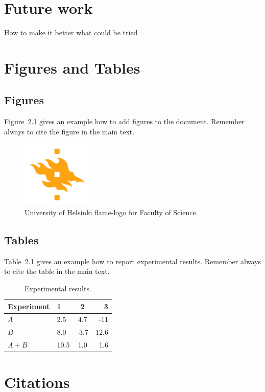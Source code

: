 \chapter{Future work}
How to make it better what could be tried 

\chapter{Figures and Tables}

\section{Figures}
Figure~\ref{fig:logo} gives an example how to add figures to the document. Remember always to cite the figure in the main text.

\begin{figure}[h!] 
\centering 
\includegraphics[width=0.3\textwidth]{HY-logo-ml.png}
\caption{University of Helsinki flame-logo for Faculty of Science.\label{fig:logo}}
\end{figure}

\section{Tables}

Table~\ref{table:results} gives an example how to report experimental results. Remember always to cite the table in the main text. 

\begin{table}
\centering
\caption{Experimental results.\label{table:results}}
\begin{tabular}{l||l c r} 
Experiment & 1 & 2 & 3 \\ 
\hline \hline 
$A$ & 2.5 & 4.7 & -11 \\
$B$ & 8.0 & -3.7 & 12.6 \\
$A+B$ & 10.5 & 1.0 & 1.6 \\
\hline
%
\end{tabular}
\end{table}

\chapter{Citations}

